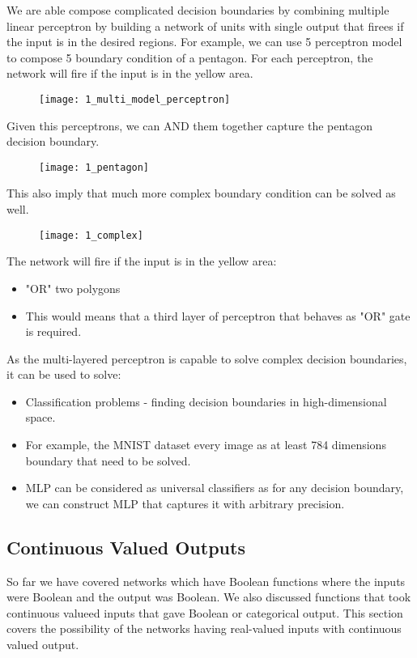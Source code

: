 \hfill\break
We are able compose complicated decision boundaries by combining multiple linear perceptron by building a network of units with single output that firees if the input is in the desired regions. For example, we can use 5 perceptron model to compose 5 boundary condition of a pentagon. For each perceptron, the network will fire if the input is in the yellow area.

\begin{figure}[H]
	\centering
	\texttt{[image: 1\_multi\_model\_perceptron]}
\end{figure}

\hfill\break
Given this perceptrons, we can AND them together capture the pentagon decision boundary.

\begin{figure}[H]
	\centering
	\texttt{[image: 1\_pentagon]}
\end{figure}

\hfill\break
This also imply that much more complex boundary condition can be solved as well.

\begin{figure}[H]
	\centering
	\texttt{[image: 1\_complex]}
\end{figure}

\hfill\break
The network will fire if the input is in the yellow area:
\begin{itemize}
	\item "OR" two polygons
	\item This would means that a third layer of perceptron that behaves as "OR" gate is required.
\end{itemize}

\hfill\break
As the multi-layered perceptron is capable to solve complex decision boundaries, it can be used to solve:
\begin{itemize}
	\item Classification problems - finding decision boundaries in high-dimensional space.
	\item For example, the MNIST dataset every image as at least 784 dimensions boundary that need to be solved.
	\item MLP can be considered as universal classifiers as for any decision boundary, we can construct MLP that captures it with arbitrary precision.
\end{itemize}

\subsection{Continuous Valued Outputs}
So far we have covered networks which have Boolean functions where the inputs were Boolean and the output was Boolean. We also discussed functions that took continuous valueed inputs that gave Boolean or categorical output. This section covers the possibility of the networks having real-valued inputs with continuous valued output.

